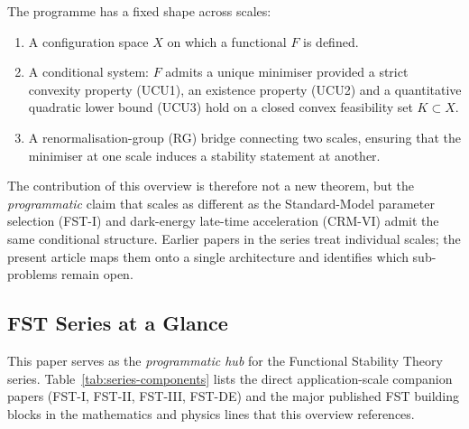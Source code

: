 \documentclass[11pt,a4paper]{article}
\theoremstyle{remark}
\begin{document}
The programme has a fixed shape across scales:
\begin{enumerate}[label=(\roman*),leftmargin=2em]
\item A configuration space $X$ on which a functional $F$ is defined.
\item A conditional system: $F$ admits a unique minimiser provided
      a strict convexity property (UCU1), an existence property (UCU2)
      and a quantitative quadratic lower bound (UCU3) hold on
      a closed convex feasibility set $K \subset X$.
\item A renormalisation-group (RG) bridge connecting two scales,
      ensuring that the minimiser at one scale induces a stability
      statement at another.
\end{enumerate}
The contribution of this overview is therefore not a new theorem,
but the \emph{programmatic} claim that scales as different as the
Standard-Model parameter selection (FST-I) and dark-energy late-time
acceleration (CRM-VI) admit the same conditional structure. Earlier
papers in the series treat individual scales; the present article
maps them onto a single architecture and identifies which sub-problems
remain open.

\subsection*{FST Series at a Glance}
\label{subsec:series-glance}

This paper serves as the \emph{programmatic hub} for the Functional
Stability Theory series. Table~\ref{tab:series-components} lists the
direct application-scale companion papers (FST-I, FST-II, FST-III,
FST-DE) and the major published FST building blocks in the mathematics
and physics lines that this overview references.
\end{document}
